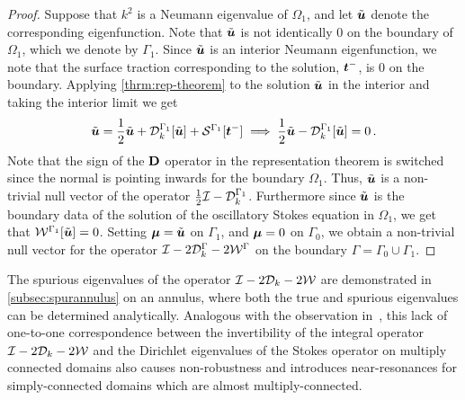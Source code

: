 
\begin{proof}
  Suppose that $k^2$ is a Neumann eigenvalue of $\Omega_{1}$, and
  let $\tilde{{\boldsymbol u}}$ denote the corresponding eigenfunction. 
  Note that $\tilde{{\boldsymbol u}}$ is not identically $0$ on the boundary
  of $\Omega_{1}$, which we denote by $\Gamma_1$.
  Since $\tilde{{\boldsymbol u}}$ is an interior Neumann eigenfunction, we note that
  the surface traction corresponding to the solution, ${\boldsymbol t}^{-}$, is $0$
  on the boundary.
  Applying \cref{thrm:rep-theorem} to the
  solution $\tilde{{\boldsymbol u}}$ in the interior
  and taking the interior limit we get
\begin{equation}
\tilde{{\boldsymbol u}} = \frac{1}{2}\tilde{{\boldsymbol u}} + {\mathcal D}^{\Gamma_{1}}_{k}[\tilde{{\boldsymbol u}}] +
{\mathcal S}^{\Gamma_{1}} [{\boldsymbol t}^{-}] \implies \frac{1}{2} \tilde{{\boldsymbol u}} - {\mathcal D}^{\Gamma_{1}}_{k}[\tilde{{\boldsymbol u}}]
= 0\, .
\end{equation}
Note that the sign of the ${\bf D}$ operator in the
representation theorem is switched since the normal
is pointing inwards for the boundary $\Omega_{1}$.
Thus, $\tilde{{\boldsymbol u}}$ is a non-trivial null vector of the operator 
$\frac{1}{2}\mathcal I - {\mathcal D}^{\Gamma_{1}}_{k}$. 
Furthermore since $\tilde{{\boldsymbol u}}$ is the boundary data of 
the solution of the oscillatory Stokes equation
in $\Omega_{1}$, we get that ${\mathcal W}^{\Gamma_{1}}[\tilde{{\boldsymbol u}}] = 0$.
Setting ${\boldsymbol \mu} = \tilde{{\boldsymbol u}}$ on $\Gamma_{1}$, and
${\boldsymbol \mu} = 0$ on $\Gamma_{0}$, we obtain a non-trivial null
vector for the operator $\mathcal I - 2{\mathcal D}^{\Gamma}_{k} -2{\mathcal W}^{\Gamma}$
on the boundary $\Gamma = \Gamma_{0} \cup \Gamma_{1}$.
\end{proof}

The spurious eigenvalues of the operator $\mathcal I-2{\mathcal D}_{k}-2{\mathcal W}$
are demonstrated in \cref{subsec:spurannulus} on an annulus,
where both the true and spurious eigenvalues can be
determined analytically. 
Analogous with the observation in~\cite{zhao2015robust},
this lack of one-to-one correspondence between
the invertibility of the integral operator $\mathcal I - 2{\mathcal D}_{k} - 2{\mathcal W}$
and the Dirichlet eigenvalues of the Stokes operator on multiply
connected domains also causes non-robustness and introduces
near-resonances for simply-connected domains which are almost
multiply-connected.


